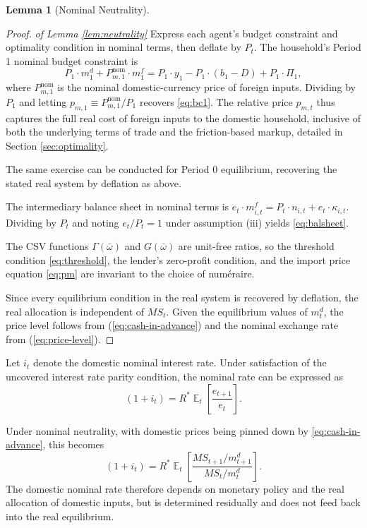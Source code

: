\documentclass[11pt]{article}
\DeclareMathOperator{\E}{\mathbb{E}}
\theoremstyle{definition}
\theoremstyle{plain}
\newtheorem{lemma}{Lemma}
\theoremstyle{remark}
\begin{document}
\begin{appendices}
\begin{lemma}[Nominal Neutrality]
\end{lemma}

\begin{proof} \label{proof:neutrality}
\textit{of Lemma \ref{lem:neutrality}} Express each agent's budget constraint and optimality condition in nominal terms, then deflate by $P_t$. The household's Period 1 nominal budget
constraint is
\begin{equation*}
    P_1 \cdot m^d_1 + P^{\text{nom}}_{m,1} \cdot m^f_1
    = P_1 \cdot y_1 - P_1 \cdot (b_1 - D) + P_1 \cdot \Pi_1,
\end{equation*}
where $P^{\text{nom}}_{m,1}$ is the nominal domestic-currency price of foreign inputs. Dividing by $P_1$ and letting $p_{m,1} \equiv P^{\text{nom}}_{m,1}/P_1$ recovers \eqref{eq:bc1}. The relative price $p_{m,t}$ thus captures the full real cost of foreign inputs to the domestic household, inclusive of both the underlying terms of trade and the friction-based markup, detailed in Section \ref{sec:optimality}. 

The same exercise can be conducted for Period 0 equilibrium, recovering the stated real system by deflation as above.

The intermediary balance sheet in nominal terms is $e_t \cdot m^f_{i,t} = P_t \cdot n_{i,t} + e_t \cdot \kappa_{i,t}$. Dividing by $P_t$ and noting $e_t/P_t = 1$ under assumption (iii) yields \eqref{eq:balsheet}.

The CSV functions $\Gamma(\bar{\omega})$ and $G(\bar{\omega})$ are unit-free ratios, so the threshold condition \eqref{eq:threshold}, the lender's zero-profit condition, and the import price equation \eqref{eq:pm} are invariant to the choice of num\'{e}raire.

Since every equilibrium condition in the real system is recovered by deflation, the real allocation is independent of $MS_t$. Given the equilibrium values of $m^d_t$, the price level follows from (\ref{eq:cash-in-advance}) and the nominal exchange rate from (\ref{eq:price-level}).

\end{proof}

Let $i_t$ denote the domestic nominal interest rate. Under satisfaction of the uncovered interest rate parity condition, the nominal rate can be expressed as
\begin{equation}
    (1+i_t)=R^*\E_t\left[\frac{e_{t+1}}{e_t}\right].
\end{equation}

Under nominal neutrality, with domestic prices being pinned down by \eqref{eq:cash-in-advance}, this becomes
\begin{equation}
    (1+i_t)=R^*\E_t\left[\frac{MS_{t+1}/m^d_{t+1}}{MS_t/m^d_t}\right].
\end{equation}
The domestic nominal rate therefore depends on monetary policy and the real allocation of domestic inputs, but is determined residually and does not feed back into the real equilibrium.


\end{appendices}
\end{document}
